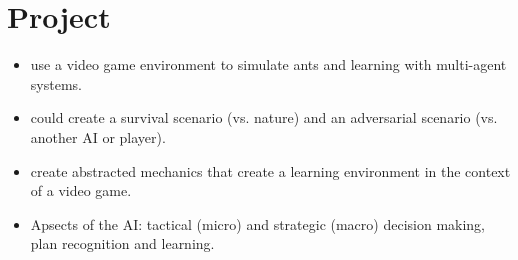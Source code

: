 
\chapter{Project}
\label{ch:Project}

\begin{itemize}[noitemsep,nolistsep]
	\item use a video game environment to simulate ants and learning with multi-agent systems.
	\item could create a survival scenario (vs. nature) and an adversarial scenario (vs. another AI or player).
	\item create abstracted mechanics that create a learning environment in the context of a video game.
	\item Apsects of the AI: tactical (micro) and strategic (macro) decision making, plan recognition and learning.
\end{itemize}